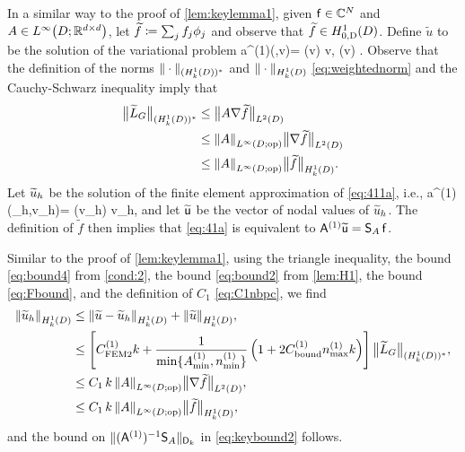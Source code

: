 \label{page:lemkeylemma2proof}
In a similar way to the proof of \cref{lem:keylemma1}, given $\mathsf{f} \in \mathbb C^N$ and $A\in \LiDRRdtd$, let $\widetilde{f} \coloneqq \sum_j f_j \phi_j$ and observe that $\widetilde{f} \in \HozDD$. Define $\widetilde{u}$ to be the solution of the variational problem 
\beq\label{eq:411a}
a^{(1)}(,v)= \LGtilde(v) \quad{} v\in \HozDD,
\quad{} \quad
 \LGtilde(v) \de {}.
\eeq
Observe that the definition of the norms $\|\cdot\|_{(\HokD)^*}$ and $\|\cdot\|_{\HokD}$ \cref{eq:weightednorm} and the Cauchy-Schwarz inequality imply that
\begin{align}
\big\| \LGtilde\big\|_{(\HokD)^*}&\leq \big\|A\nabla \widetilde{f}\big\|_{\LtD}\nonumber\\
&\leq \NLiDop{A} \big\|\nabla \widetilde{f}\big\|_{\LtD}\label{eq:Fbounda}\\
&\leq \NLiDop{A} \big\| \widetilde{f}\big\|_{\HokD}.\label{eq:Fbound}
\end{align}
Let $\widetilde{u}_h$ be the solution of the finite element approximation of \cref{eq:411a}, i.e.,
\beq\label{eq:41a}
a^{(1)}(\tu_h,v_h)= \LGtilde(v_h) \quad{} v_h\in \Vhp,
\eeq
and let $\widetilde{\mathsf{u}}$ be the vector of nodal values of $\widetilde{u}_h$. The definition of $\widetilde{f}$ then implies that \cref{eq:41a} is equivalent to $\mathsf{A}^{(1)} \widetilde{\mathsf{u}} = \mathsf{S}_A\,\mathsf{f}$. 

Similar to the proof of \cref{lem:keylemma1},
using the triangle inequality, the bound \cref{eq:bound4} from \cref{cond:2}, the bound \cref{eq:bound2} from \cref{lem:H1}, the bound \cref{eq:Fbound}, and the definition of $C_1$ \cref{eq:C1nbpc},
we find
\begin{align}\nonumber 
\N{\tu_h}_{\HokD} &\leq
\N{\tu-\tu_h}_{\HokD} + \N{\tu}_{\HokD},\nonumber \\ \nonumber
& \leq \left[ C^{(1)}_{\rm FEM2} k + 
\frac{1}{\min\{\Asomin,\nsomin\}}\left( 1 + 2 C^{(1)}_{\rm bound}\nsomax k  \right) 
\right]\big\|\LGtilde\big\|_{(\HokD)^*},\\
&\leq C_1 \, k\, 
\NLiDop{A} \big\|\nabla\widetilde{f}\big\|_{\LtD},\label{eq:mainevent2}\\
&\leq C_1 \, k\, 
\NLiDop{A} \big\|\widetilde{f}\big\|_{\HokD},\nonumber
\end{align}
and the bound on $\|(\mathsf{A}^{(1)})^{-1}\mathsf{S}_A\|_{\mathsf{D}_k}$ in \cref{eq:keybound2} follows.

